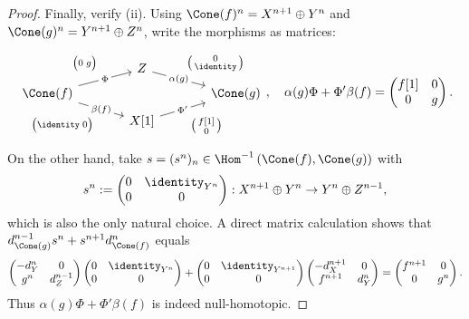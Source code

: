 \begin{proof}
	Finally, verify (ii). Using $\Cone(f)^n=X^{n+1}\oplus Y^n$ and
	$\Cone(g)^n=Y^{n+1}\oplus Z^n$, write the morphisms as matrices:
	\begin{gather*}\begin{tikzcd}[row sep=tiny, column sep=large, ampersand replacement=\&]
		\& Z \arrow[rd, "\alpha(g)" description, "{\bigl(\begin{smallmatrix} 0 \\ \identity \end{smallmatrix} \bigr)}" inner sep=0.6em] \& \\
		\Cone(f) \arrow[ru, "\Phi" description, "{\bigl( 0 \; g \bigr)}" inner sep=0.6em] \arrow[rd, "\beta(f)" description, "{\big( \identity \; 0 \bigr)}"' inner sep=0.6em] \& \& \Cone(g) \\
		\& X[1] \arrow[ru, "{\Phi'}" description, "{\bigl( \begin{smallmatrix} f[1] \\ 0 \end{smallmatrix} \bigr)}"' inner sep=0.6em] \&
	\end{tikzcd}, \quad
		\alpha(g) \Phi + \Phi' \beta(f) = \begin{pmatrix} f[1] & 0 \\ 0 & g  \end{pmatrix}.
	\end{gather*}
	On the other hand, take
	$s=(s^n)_n\in\Hom^{-1}\left(\Cone(f),\Cone(g)\right)$ with
	\[ s^n := \begin{pmatrix}
		0 & \identity_{Y^n} \\
		0 & 0
	\end{pmatrix}: X^{n+1} \oplus Y^n \to Y^n \oplus Z^{n-1} , \]
	which is also the only natural choice. A direct matrix calculation shows
	that $d_{\Cone(g)}^{n-1}s^n+s^{n+1}d_{\Cone(f)}^n$ equals
	\[\begin{pmatrix}
		-d_Y^n & 0 \\
		g^n & d_Z^{n-1}
	\end{pmatrix} \begin{pmatrix}
		0 & \identity_{Y^n} \\
		0 & 0
	\end{pmatrix} + \begin{pmatrix}
		0 & \identity_{Y^{n+1}} \\
		0 & 0
	\end{pmatrix} \begin{pmatrix}
		-d_X^{n+1} & 0 \\
		f^{n+1} & d_Y^n
	\end{pmatrix} = \begin{pmatrix}
		f^{n+1} & 0 \\
		0 & g^n
	\end{pmatrix}.\]
	Thus $\alpha(g)\Phi+\Phi'\beta(f)$ is indeed null-homotopic.
\end{proof}

